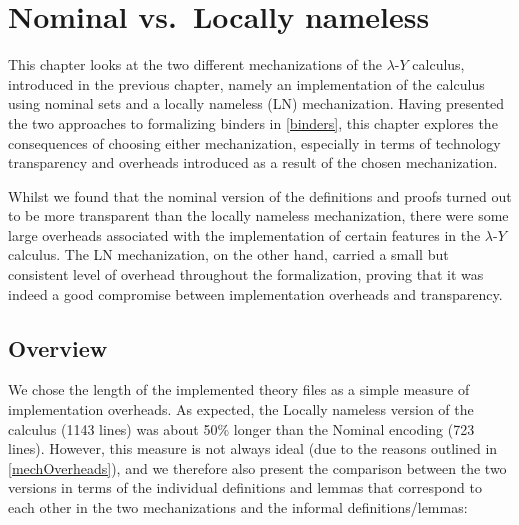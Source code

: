 \documentclass[a4paper, 12pt, twoside]{style/ociamthesis}
\theoremstyle{plain}
\theoremstyle{definition}
\theoremstyle{remark}
\newcommand{\lamy}{\lambda\text{-}Y}
\begin{document}
\chapter{Nominal vs.~Locally nameless}\label{comp-isa}

\label{chap:compIsa}

This chapter looks at the two different mechanizations of the \(\lamy\)
calculus, introduced in the previous chapter, namely an implementation
of the calculus using nominal sets and a locally nameless (LN)
mechanization. Having presented the two approaches to formalizing
binders in \cref{binders}, this chapter explores the consequences of
choosing either mechanization, especially in terms of technology
transparency and overheads introduced as a result of the chosen
mechanization.

Whilst we found that the nominal version of the definitions and proofs
turned out to be more transparent than the locally nameless
mechanization, there were some large overheads associated with the
implementation of certain features in the \(\lamy\) calculus. The LN
mechanization, on the other hand, carried a small but consistent level
of overhead throughout the formalization, proving that it was indeed a
good compromise between implementation overheads and transparency.

\section{Overview}\label{overview-1}

We chose the length of the implemented theory files as a simple measure
of implementation overheads. As expected, the Locally nameless version
of the calculus (1143 lines) was about 50\% longer than the Nominal
encoding (723 lines). However, this measure is not always ideal (due to
the reasons outlined in \cref{mechOverheads}), and we therefore also
present the comparison between the two versions in terms of the
individual definitions and lemmas that correspond to each other in the
two mechanizations and the informal definitions/lemmas:

\newcommand{\lem}[1]{\bf{lemma}\ \it{#1}}
\newcommand{\fun}[1]{\bf{fun}\ \it{#1}}
\newcommand{\nfun}[1]{\bf{nominal\_function}\ \it{#1}}
\newcommand{\dat}[1]{\bf{datatype}\ \it{#1}}
\newcommand{\ndat}[1]{\bf{nominal\_datatype}\ \it{#1}}
\newcommand{\induct}[1]{\bf{inductive}\ \it{#1}}
\end{document}
